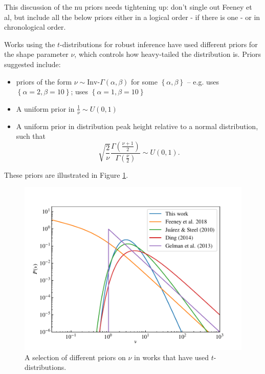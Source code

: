 \documentclass[fleqn,usenatbib]{rasti}
\begin{document}
{\color{green} This discussion of the nu priors needs tightening up: don't single out Feeney et al, but include all the below priors either in a logical order - if there is one - or in chronological order.}

Works using the $t$-distributions for robust inference have used different
priors for the shape parameter $\nu$, which controls how heavy-tailed the
distribution is. Priors suggested include:
\begin{itemize}
    \item priors of the form $\nu \sim \text{Inv-}\Gamma(\alpha, \beta)$ for
          some $\left\{\alpha, \beta\right\}$ -- e.g.
          \citet{Juarez:2010} uses $\left\{\alpha = 2, \beta = 10\right\}$;
          \citet{Ding:2014} uses $\left\{\alpha = 1, \beta = 10\right\}$
    \item A uniform prior in $\frac1\nu \sim U(0, 1)$ \citep{Gelman:2013}
    \item A uniform prior in distribution peak height relative to a normal
    distribution, such that
    \begin{equation}
        \sqrt{\frac2\nu}\frac{\Gamma\left(\frac{\nu + 1}{2}\right)}{\Gamma\left(\frac{\nu}{2}\right)} \sim U(0, 1).
    \end{equation}
\end{itemize}
These priors are illustrated in Figure \ref{fig:priors.pdf}.

\begin{figure}
	\includegraphics[width=\columnwidth]{graphics/pdf_nu}
    \caption{A selection of different priors on $\nu$ in works that have used
    $t$-distributions.}
    \label{fig:priors.pdf}
\end{figure}
\end{document}
